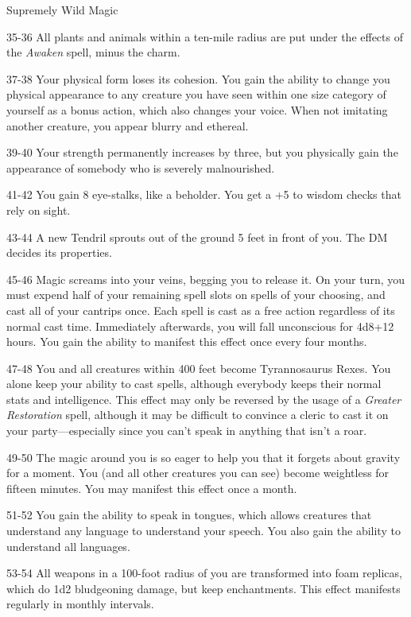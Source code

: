 \begin{rolltable}[0.9\textheight/0pt]{Supremely Wild Magic}
\item[35-36] All plants and animals within a ten-mile radius are put under the effects of the \textit{Awaken} spell, minus the charm.
\item[37-38] Your physical form loses its cohesion.
You gain the ability to change you physical appearance to any creature you have seen within one size category of yourself as a bonus action, which also changes your voice.
When not imitating another creature, you appear blurry and ethereal.
\item[39-40] Your strength permanently increases by three, but you physically gain the appearance of somebody who is severely malnourished.
\item[41-42] You gain 8 eye-stalks, like a beholder. You get a +5 to wisdom checks that rely on sight.
\item[43-44] A new Tendril sprouts out of the ground 5 feet in front of you. The DM decides its properties.
\item[45-46] Magic screams into your veins, begging you to release it.
On your turn, you must expend half of your remaining spell slots on spells of your choosing, and cast all of your cantrips once.
Each spell is cast as a free action regardless of its normal cast time.
Immediately afterwards, you will fall unconscious for 4d8+12 hours.
You gain the ability to manifest this effect once every four months.
\item[47-48] You and all creatures within 400 feet become Tyrannosaurus Rexes.
You alone keep your ability to cast spells, although everybody keeps their normal stats and intelligence.
This effect may only be reversed by the usage of a \textit{Greater Restoration} spell, although it may be difficult to convince a cleric to cast it on your party---especially since you can't speak in anything that isn't a roar.
\item[49-50] The magic around you is so eager to help you that it forgets about gravity for a moment.
You (and all other creatures you can see) become weightless for fifteen minutes.
You may manifest this effect once a month.
\item[51-52] You gain the ability to speak in tongues, which allows creatures that understand any language to understand your speech.
You also gain the ability to understand all languages.
\item[53-54] All weapons in a 100-foot radius of you are transformed into foam replicas, which do 1d2 bludgeoning damage, but keep enchantments.
This effect manifests regularly in monthly intervals.

\end{rolltable}
